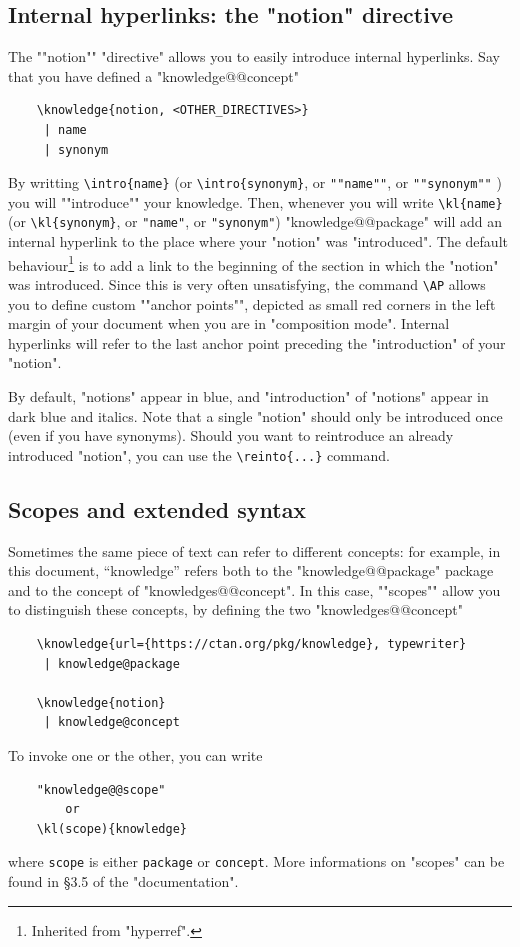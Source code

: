 \documentclass{article}
\begin{document}
\subsection{Internal hyperlinks: the "notion" directive}

The ""notion"" "directive" allows you to easily introduce internal hyperlinks.
Say that you have defined a "knowledge@@concept"
\begin{verbatim}
    \knowledge{notion, <OTHER_DIRECTIVES>}
     | name
     | synonym
\end{verbatim}
By writting \verb|\intro{name}| (or
\verb|\intro{synonym}|, or 
%
\verb|""name""|, or \verb|""synonym""|%
) you will \AP""introduce"" your knowledge. Then, whenever you will write
\verb|\kl{name}| (or
\verb|\kl{synonym}|, or 
%
\verb|"name"|, or \verb|"synonym"|)%
"knowledge@@package" will add an internal hyperlink to the place where
your "notion" was "introduced". The default behaviour\footnote{Inherited from
"hyperref".} is to add a link to the beginning of the section in which the "notion" was introduced. Since this is very often unsatisfying, the command
\verb|\AP| allows you to define custom \AP""anchor points"", depicted as 
small red corners in the left margin of your document when you are in "composition mode".
Internal hyperlinks 
will refer to the last anchor point preceding the "introduction" of your 
"notion".

By default, "notions" appear in blue, and "introduction" of "notions"
appear in dark blue and italics.
Note that a single "notion" should only be introduced once (even if you have synonyms). Should you want to reintroduce an already introduced "notion", 
you can use the \verb|\reinto{...}| command.

\subsection{Scopes and extended syntax}

Sometimes the same piece of text can refer to different concepts: for example, in this document, ``knowledge'' refers both to the "knowledge@@package" package
and to the concept of "knowledges@@concept". In this case, \AP""scopes"" allow 
you to distinguish these concepts, by defining the two "knowledges@@concept"
\begin{verbatim}
    \knowledge{url={https://ctan.org/pkg/knowledge}, typewriter}
     | knowledge@package

    \knowledge{notion}
     | knowledge@concept
\end{verbatim}
To invoke one or the other, you can write
%
\begin{verbatim}
    "knowledge@@scope"
        or
    \kl(scope){knowledge}
\end{verbatim}
%
where \verb|scope| is either \verb|package| or
\verb|concept|.
More informations on "scopes" can be found in §3.5 of the "documentation".
\end{document}
